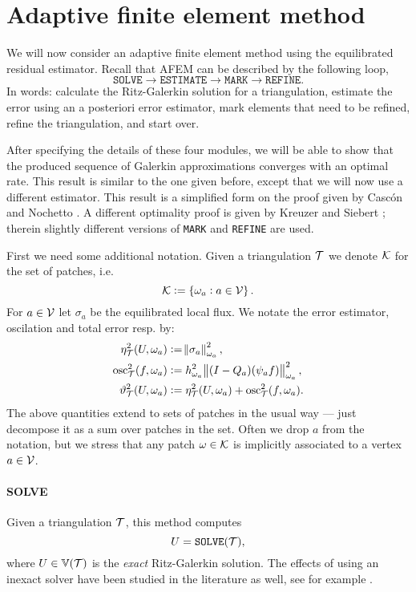 \documentclass[thesis.tex]{subfiles}
\begin{document}
\section{Adaptive finite element method}
We will now consider an adaptive finite element method using the equilibrated residual estimator.
Recall that AFEM can be described by the following loop,
\[
  \texttt{SOLVE} \to \texttt{ESTIMATE} \to \texttt{MARK} \to \texttt{REFINE}.
\]
In words: calculate the Ritz-Galerkin solution for a triangulation, estimate
the error using an a posteriori error estimator, mark elements that need to be refined, refine
the triangulation, and start over. 

After specifying the details of these four modules, we will be able to show that the produced
sequence of Galerkin approximations converges with an optimal rate. This result
is similar to the one given before, except that we will now use a different estimator. This
result is a simplified form on the proof given by Casc\'on and Nochetto \cite{cascon2012}.
A different optimality proof is given by Kreuzer and Siebert \cite{ainsworthbernstein}; therein
slightly different versions of \texttt{MARK} and \texttt{REFINE} are used.

First we need some additional notation. Given a triangulation $\mathcal{T}$ we denote $\mathcal{K}$ for the set of patches, i.e. 
\[
  \mathcal{K} := \set{\omega_a : a \in \mathcal{V}}.
\]
For $a \in \mathcal{V}$ let $\sigma_a$ be the equilibrated local flux. We notate the
  error estimator, oscilation and total error resp. by:
\begin{align*}
  \eta^2_{\mathcal{T}}(U, \omega_a) &:= \norm{\sigma_a}^2_{\omega_a}, \\
  \operatorname{osc}^2_{\mathcal{T}}(f, \omega_a) &:=h^2_{\omega_a} \norm{(I - Q_a) (\psi_a f)}^2_{\omega_a}, \\
  \vartheta^2_{\mathcal{T}}(U, \omega_a) &:= \eta^2_{\mathcal{T}}(U, \omega_a) + \operatorname{osc}^2_{\mathcal{T}}(f, \omega_a).
\end{align*}
The above quantities extend to sets of patches in the usual way 
--- just decompose it as a sum over patches in the set.
Often we drop $a$ from the notation, but we stress that any patch $\omega \in \mathcal{K}$ is implicitly
associated to a vertex $a \in \mathcal{V}$.


\paragraph{SOLVE}Given a triangulation $\mathcal{T}$, this method computes
\[
  U = \texttt{SOLVE}(\mathcal{T}),
\]
where $U \in \mathbb{V}(\mathcal{T})$ is the \emph{exact} Ritz-Galerkin solution. The effects of using an inexact solver have
been studied in the literature as well, see for example \cite[\S7]{carstensen2014axioms}.
\end{document}

